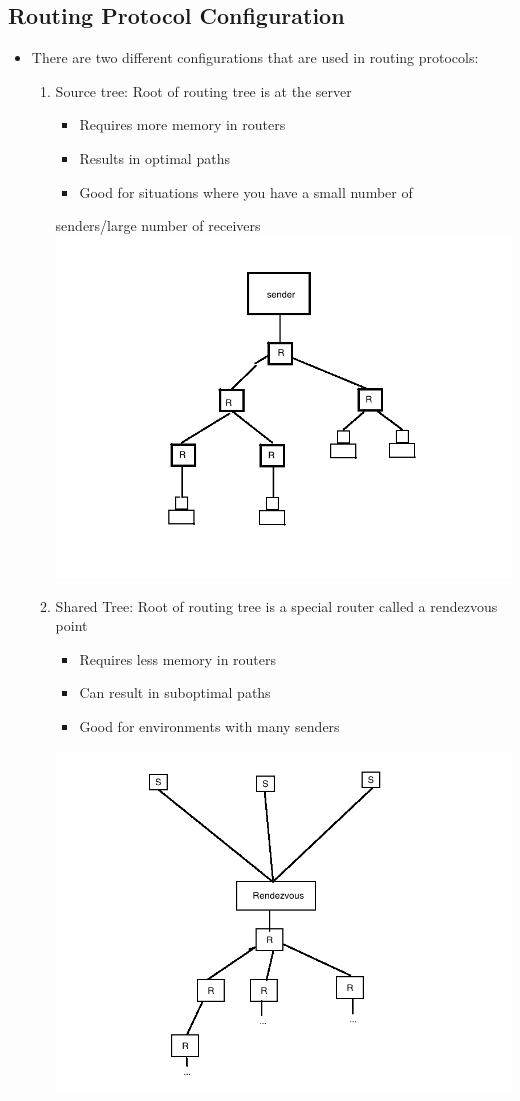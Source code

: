 \documentclass[11pt]{article}
\begin{document}
\subsection{Routing Protocol Configuration}
\label{sec:orgheadline103}
\begin{itemize}
\item There are two different configurations that are used in routing
protocols:
\begin{enumerate}
\item Source tree: Root of routing tree is at the server
\begin{itemize}
\item Requires more memory in routers
\item Results in optimal paths
\item Good for situations where you have a small number of
\end{itemize}
senders/large number of receivers
\includegraphics[width=.9\linewidth]{diagrams/sourcetree.png}
\item Shared Tree: Root of routing tree is a special router called a
rendezvous point
\begin{itemize}
\item Requires less memory in routers
\item Can result in suboptimal paths
\item Good for environments with many senders
\end{itemize}
\includegraphics[width=.9\linewidth]{diagrams/sharedtree.png}
\end{enumerate}
\end{itemize}
\end{document}
